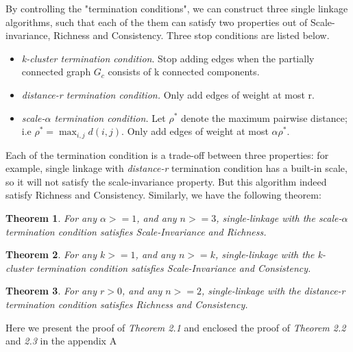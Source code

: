 \documentclass{uonmathreport}
\newtheorem{theorem}{Theorem}[section]
\begin{document}
By controlling the "termination conditions", we can construct three single linkage algorithms, such that each of the them can satisfy two properties out of Scale-invariance, Richness and Consistency. Three stop conditions are listed below\cite{Kleinberg}.
\begin{itemize}
\item \textit{k-cluster termination condition}. Stop adding edges when the partially connected graph $G_{c}$ consists of k connected components.
  
\item \textit{distance-r termination condition.} Only add edges of weight at most r.
  
\item \textit{scale-$\alpha$ termination condition.} Let $\rho^*$ denote the maximum pairwise distance; i.e $\rho^* = \max_{i,j}d(i,j)$. Only add edges of weight at most $\alpha\rho^{*}$.
\end{itemize}

Each of the termination condition is a trade-off between three properties: for example, single linkage with \textit{distance-r} termination condition has a built-in scale, so it will not satisfy the scale-invariance property. But this algorithm indeed satisfy Richness and Consistency. Similarly, we have the following theorem:
\begin{theorem}
\label{first theorem}
For any $\alpha>=1$, and any $n>=3$, single-linkage with the scale-$\alpha$ termination condition satisfies Scale-Invariance and Richness.
\end{theorem}
\begin{theorem}
\label{second theorem}
For any $k>=1$, and any $n>=k$, single-linkage with the k-cluster termination condition satisfies Scale-Invariance and Consistency.
\end{theorem}
\begin{theorem}
\label{third theorem}
For any $r>0$, and any $n>=2$, single-linkage with the distance-r termination condition satisfies Richness and Consistency.
\end{theorem}

Here we present the proof of \textit{Theorem 2.1} and enclosed the proof of \textit{Theorem 2.2} and \textit{2.3} in the appendix A
\end{document}
